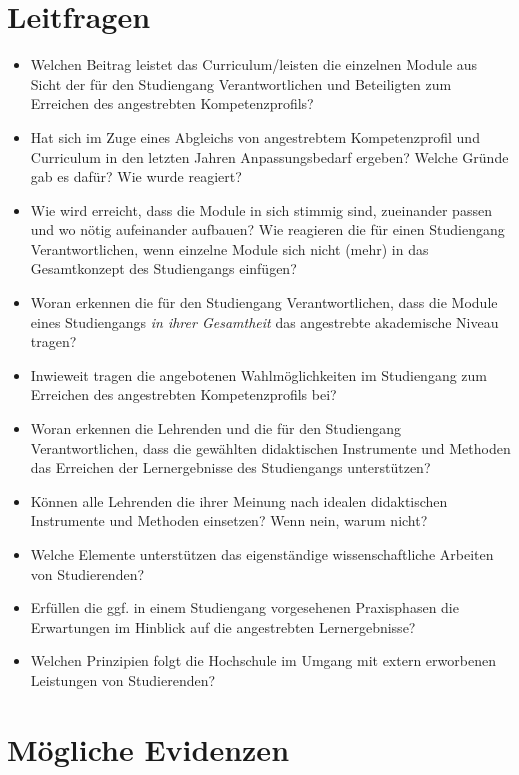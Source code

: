 \section{Leitfragen}\label{leitfragen}

\begin{itemize}
\item
  Welchen Beitrag leistet das Curriculum/leisten die einzelnen Module
  aus Sicht der für den Studiengang Verantwortlichen und Beteiligten zum
  Erreichen des angestrebten Kompetenzprofils?
\item
  Hat sich im Zuge eines Abgleichs von angestrebtem Kompetenzprofil und
  Curriculum in den letzten Jahren Anpassungsbedarf ergeben? Welche
  Gründe gab es dafür? Wie wurde reagiert?
\item
  Wie wird erreicht, dass die Module in sich stimmig sind, zueinander
  passen und wo nötig aufeinander aufbauen? Wie reagieren die für einen
  Studiengang Verantwortlichen, wenn einzelne Module sich nicht (mehr)
  in das Gesamtkonzept des Studiengangs einfügen?
\item
  Woran erkennen die für den Studiengang Verantwortlichen, dass die
  Module eines Studiengangs \emph{in ihrer Gesamtheit} das angestrebte
  akademische Niveau tragen?
\item
  Inwieweit tragen die angebotenen Wahlmöglichkeiten im Studiengang zum
  Erreichen des angestrebten Kompetenzprofils bei?
\item
  Woran erkennen die Lehrenden und die für den Studiengang
  Verantwortlichen, dass die gewählten didaktischen Instrumente und
  Methoden das Erreichen der Lernergebnisse des Studiengangs
  unterstützen?
\item
  Können alle Lehrenden die ihrer Meinung nach idealen didaktischen
  Instrumente und Methoden einsetzen? Wenn nein, warum nicht?
\item
  Welche Elemente unterstützen das eigenständige wissenschaftliche
  Arbeiten von Studierenden?
\item
  Erfüllen die ggf. in einem Studiengang vorgesehenen Praxisphasen die
  Erwartungen im Hinblick auf die angestrebten Lernergebnisse?
\item
  Welchen Prinzipien folgt die Hochschule im Umgang mit extern
  erworbenen Leistungen von Studierenden?
\end{itemize}

\section{Mögliche Evidenzen}\label{muxf6gliche-evidenzen}

